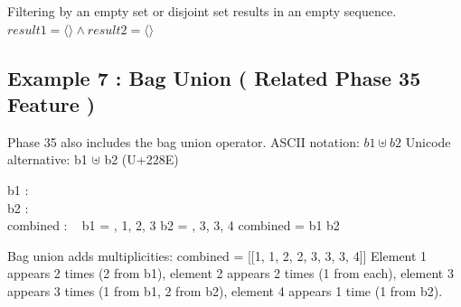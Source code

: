 \documentclass[a4paper,10pt,fleqn]{article}
\begin{document}
\noindent Filtering by an empty set or disjoint set results in an empty sequence. $result1 = \langle \rangle \land result2 = \langle \rangle$

\bigskip

\subsection*{Example 7 : Bag Union ( Related Phase 35 Feature )}

\noindent Phase 35 also includes the bag union operator. ASCII notation: $b1 \uplus b2$ Unicode alternative: b1 $\uplus$ b2 (U+228E)

\bigskip

\begin{axdef}
b1 : \bag~\nat \\
b2 : \bag~\nat \\
combined : \bag~\nat
\where
b1 = , 1, 2, 3 \rbag \land b2 = , 3, 3, 4 \rbag \land combined = b1 \uplus b2
\end{axdef}

\noindent Bag union adds multiplicities: combined = [[1, 1, 2, 2, 3, 3, 3, 4]] Element 1 appears 2 times (2 from b1), element 2 appears 2 times (1 from each), element 3 appears 3 times (1 from b1, 2 from b2), element 4 appears 1 time (1 from b2).

\bigskip
\end{document}
